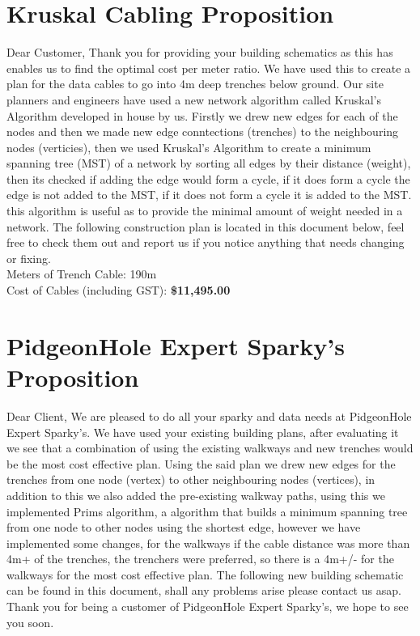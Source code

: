 \documentclass[11pt]{book}
\renewcommand{\=}[1]{\stackrel{#1}{=}} %
\theoremstyle{definition}
\theoremstyle{remark}
\begin{document}
\section{Kruskal Cabling Proposition}
Dear Customer,
Thank you for providing your building schematics as this has enables us to find the optimal cost per meter ratio. We have used this to create a plan for the data cables to go into 4m deep trenches below ground. Our site planners and engineers have used a new network algorithm called Kruskal's Algorithm developed in house by us. 
Firstly we drew new edges for each of the nodes and
then we made new edge conntections (trenches) to the neighbouring nodes (verticies), then we used Kruskal's Algorithm to create a minimum spanning tree (MST) of a network by sorting all edges by their distance (weight), then its checked if adding the edge would form a cycle, if it does form a cycle the edge is not added to the MST, if it does not form a cycle it is added to the MST.
this algorithm is useful as to provide the minimal amount of weight needed in a network.
The following construction plan is located in this document below, feel free to check them out and report us if you notice anything that needs changing or fixing. \\

Meters of Trench Cable: 190m \\
Cost of Cables (including GST): \textbf{\$11,495.00} \\

\section{PidgeonHole Expert Sparky's Proposition}
Dear Client,
We are pleased to do all your sparky and data needs at PidgeonHole Expert Sparky's. We have used your existing building plans, after evaluating it we see that a combination of using the existing walkways and new trenches would be the most cost effective plan. 
Using the said plan we drew new edges for the trenches from one node (vertex) to other neighbouring nodes (vertices), in addition to this we also added the pre-existing walkway paths, using this we implemented Prims algorithm, a algorithm that builds a minimum spanning tree from one node to other nodes using the shortest edge, however we have implemented some changes, for the walkways if the cable distance was more than 4m+ of the
trenches, the trenchers were preferred, so there is a 4m+/- for the walkways for the most cost effective plan. The following new
building schematic can be found in this document, shall any problems arise please contact us asap. Thank you for being a
customer of PidgeonHole Expert Sparky's, we hope to see you soon. \\
\end{document}
